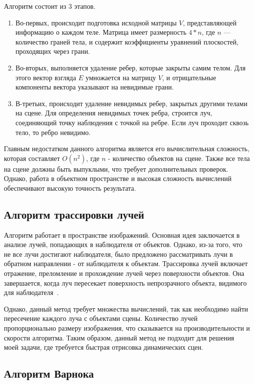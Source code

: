 Алгоритм состоит из 3 этапов.
\begin{enumerate} [label=\arabic*)]
	\item Во-первых, происходит подготовка исходной матрицы $V$, представляющей информацию о каждом теле. Матрица имеет размерность $4 * n$, где $n$ --- количество граней тела, и содержит коэффициенты уравнений плоскостей, проходящих через грани. 
	\item Во-вторых, выполняется удаление ребер, которые закрыты самим телом. Для этого вектор взгляда $E$ умножается на матрицу $V$, и отрицательные компоненты вектора указывают на невидимые грани.
	\item В-третьих, происходит удаление невидимых ребер, закрытых другими телами на сцене. Для определения невидимых точек ребра, строится луч, соединяющий точку наблюдения с точкой на ребре. Если луч проходит сквозь тело, то ребро невидимо.
\end{enumerate}

Главным недостатком данного алгоритма является его вычислительная сложность, которая составляет $O(n^2)$, где $n$ - количество объектов на сцене. Также все тела на сцене должны быть выпуклыми, что требует дополнительных проверок. Однако, работа в объектном пространстве и высокая сложность вычислений обеспечивают высокую точность результата.


\subsection{Алгоритм трассировки лучей}

Алгоритм работает в пространстве изображений. Основная идея заключается в анализе лучей, попадающих в наблюдателя от объектов. Однако, из-за того, что не все лучи достигают наблюдателя, было предложено рассматривать лучи в обратном направлении - от наблюдателя к объектам. Трассировка лучей включает отражение, преломление и прохождение лучей через поверхности объектов. Она завершается, когда луч пересекает поверхность непрозрачного объекта, видимого для наблюдателя~\cite{roders}.

Однако, данный метод требует множества вычислений, так как необходимо найти пересечение каждого луча с объектами сцены. Количество лучей пропорционально размеру изображения, что сказывается на производительности и скорости алгоритма. Таким образом, данный метод не подходит для решения моей задачи, где требуется быстрая отрисовка динамических сцен.

\subsection{Алгоритм Варнока}

